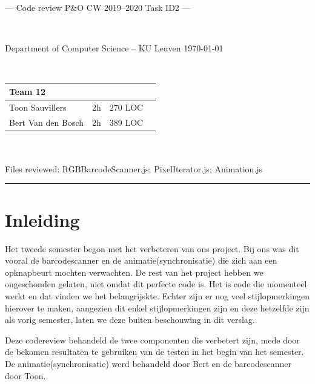 \documentclass[a4paper,11pt]{article}
\begin{document}
\noindent
\colorbox[HTML]{52BDEC}{\bfseries\parbox{\textwidth}{\centering\large
  --- Code review P\&O CW 2019--2020 Task ID2 ---
}}
\\[-1mm]
\colorbox[HTML]{00407A}{\bfseries\color{white}\parbox{\textwidth}{
  Department of Computer Science -- KU Leuven
  \hfill
  \today
}}
\\

\smallskip

\noindent
\begin{tabular}{*4l}
\toprule
\multicolumn{3}{l}{\large\textbf{Team 12}} \\
\midrule
Toon Sauvillers & 2h & 270 LOC \\ %
Bert Van den Bosch & 2h & 389 LOC \\
\bottomrule
\hline
\end{tabular}\\
\\
Files reviewed: RGBBarcodeScanner.js; PixelIterator.js; Animation.js	

\noindent
{\color[HTML]{52BDEC} \rule{\linewidth}{1mm} }

\smallskip
\section{Inleiding}
Het tweede semester begon met het verbeteren van ons project. Bij ons was dit vooral de barcodescanner en de animatie(synchronisatie) die zich aan een opknapbeurt mochten verwachten. De rest van het project hebben we ongeschonden gelaten, niet omdat dit perfecte code is. Het is code die momenteel werkt en dat vinden we het belangrijskte. Echter zijn er nog veel stijlopmerkingen hierover te maken, aangezien dit enkel stijlopmerkingen zijn en deze hetzelfde zijn als vorig semester, laten we deze buiten beschouwing in dit verslag.

Deze codereview behandeld de twee componenten die verbetert zijn, mede door de bekomen resultaten te gebruiken van de testen in het begin van het semester. De animatie(synchronisatie) werd behandeld door Bert en de barcodescanner door Toon.
\end{document}
